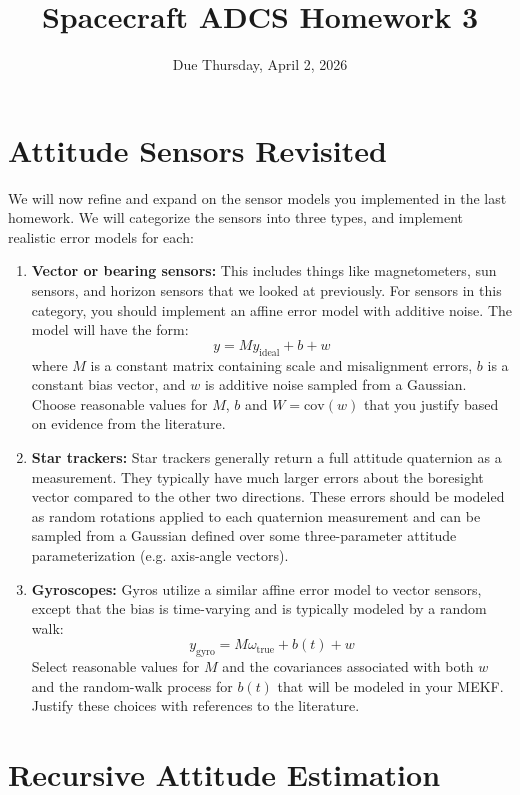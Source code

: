 \documentclass[11pt,letterpaper]{article}
\title{Spacecraft ADCS Homework 3}
\author{Due Thursday, April 2, 2026}
\date{}
\begin{document}
\maketitle

\section{Attitude Sensors Revisited}

We will now refine and expand on the sensor models you implemented in the last homework. We will categorize the sensors into three types, and implement realistic error models for each:
\begin{enumerate}
	\item \textbf{Vector or bearing sensors:} This includes things like magnetometers, sun sensors, and horizon sensors that we looked at previously. For sensors in this category, you should implement an affine error model with additive noise. The model will have the form:
		\begin{equation*}
			y = M y_{\mathrm{ideal}} + b + w
		\end{equation*}
		where $M$ is a constant matrix containing scale and misalignment errors, $b$ is a constant bias vector, and $w$ is additive noise sampled from a Gaussian. Choose reasonable values for $M$, $b$ and $W = \mathrm{cov}(w)$ that you justify based on evidence from the literature.
	\item \textbf{Star trackers:} Star trackers generally return a full attitude quaternion as a measurement. They typically have much larger errors about the boresight vector compared to the other two directions. These errors should be modeled as random rotations applied to each quaternion measurement and can be sampled from a Gaussian defined over some three-parameter attitude parameterization (e.g. axis-angle vectors).
	\item \textbf{Gyroscopes:} Gyros utilize a similar affine error model to vector sensors, except that the bias is time-varying and is typically modeled by a random walk:
		\begin{equation*}
			y_\mathrm{gyro} = M \omega_{\mathrm{true}} + b(t) + w
		\end{equation*}
		Select reasonable values for $M$ and the covariances associated with both $w$ and the random-walk process for $b(t)$ that will be modeled in your MEKF. Justify these choices with references to the literature.		
\end{enumerate}

\section{Recursive Attitude Estimation}
\end{document}
